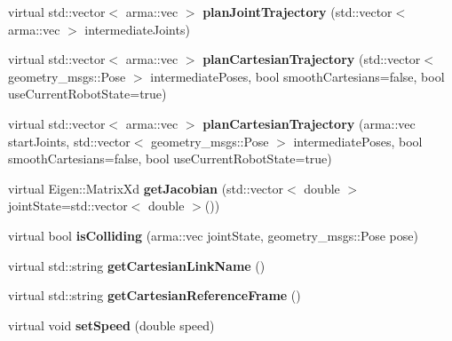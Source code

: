 \begin{DoxyCompactItemize}
\item 
virtual std\+::vector$<$ arma\+::vec $>$ {\bfseries plan\+Joint\+Trajectory} (std\+::vector$<$ arma\+::vec $>$ intermediate\+Joints)\hypertarget{classkukadu_1_1MoveIt_a5a0133f49f68c5b0b34dc34b151c6cf6}{}\label{classkukadu_1_1MoveIt_a5a0133f49f68c5b0b34dc34b151c6cf6}

\item 
virtual std\+::vector$<$ arma\+::vec $>$ {\bfseries plan\+Cartesian\+Trajectory} (std\+::vector$<$ geometry\+\_\+msgs\+::\+Pose $>$ intermediate\+Poses, bool smooth\+Cartesians=false, bool use\+Current\+Robot\+State=true)\hypertarget{classkukadu_1_1MoveIt_a24a11114333b44a8fce67affb7afe07d}{}\label{classkukadu_1_1MoveIt_a24a11114333b44a8fce67affb7afe07d}

\item 
virtual std\+::vector$<$ arma\+::vec $>$ {\bfseries plan\+Cartesian\+Trajectory} (arma\+::vec start\+Joints, std\+::vector$<$ geometry\+\_\+msgs\+::\+Pose $>$ intermediate\+Poses, bool smooth\+Cartesians=false, bool use\+Current\+Robot\+State=true)\hypertarget{classkukadu_1_1MoveIt_a455bf20309967e7bc288507f92bd4b24}{}\label{classkukadu_1_1MoveIt_a455bf20309967e7bc288507f92bd4b24}

\item 
virtual Eigen\+::\+Matrix\+Xd {\bfseries get\+Jacobian} (std\+::vector$<$ double $>$ joint\+State=std\+::vector$<$ double $>$())\hypertarget{classkukadu_1_1MoveIt_affc6ab624a10cb091a9ec5b8ad39127b}{}\label{classkukadu_1_1MoveIt_affc6ab624a10cb091a9ec5b8ad39127b}

\item 
virtual bool {\bfseries is\+Colliding} (arma\+::vec joint\+State, geometry\+\_\+msgs\+::\+Pose pose)\hypertarget{classkukadu_1_1MoveIt_a6280adfe71401d1caad3d61c07cec82f}{}\label{classkukadu_1_1MoveIt_a6280adfe71401d1caad3d61c07cec82f}

\item 
virtual std\+::string {\bfseries get\+Cartesian\+Link\+Name} ()\hypertarget{classkukadu_1_1MoveIt_aa20e8b9de995a3a50c0b60180c3f9460}{}\label{classkukadu_1_1MoveIt_aa20e8b9de995a3a50c0b60180c3f9460}

\item 
virtual std\+::string {\bfseries get\+Cartesian\+Reference\+Frame} ()\hypertarget{classkukadu_1_1MoveIt_a2c7997b863e784370dde51eff19515d2}{}\label{classkukadu_1_1MoveIt_a2c7997b863e784370dde51eff19515d2}

\item 
virtual void {\bfseries set\+Speed} (double speed)\hypertarget{classkukadu_1_1MoveIt_ae7fa8ae6dddb95872109a8c5bf2f011d}{}\label{classkukadu_1_1MoveIt_ae7fa8ae6dddb95872109a8c5bf2f011d}

\end{DoxyCompactItemize}
